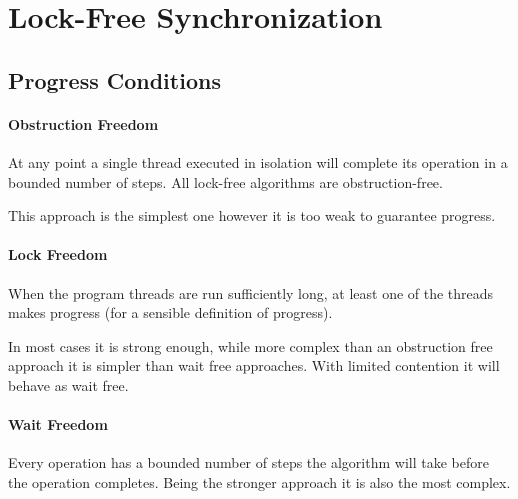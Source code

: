 \section{Lock-Free Synchronization}

\subsection{Progress Conditions}
\paragraph{Obstruction Freedom}
At any point a single thread executed in isolation will complete its operation in a bounded number of steps.
All lock-free algorithms are obstruction-free.

This approach is the simplest one however it is too weak to guarantee progress.

\paragraph{Lock Freedom}
When the program threads are run sufficiently long, at least one of the threads makes progress
(for a sensible definition of progress).

In most cases it is strong enough,
while more complex than an obstruction free approach it is simpler than wait free approaches.
With limited contention it will behave as wait free.

\paragraph{Wait Freedom}
Every operation has a bounded number of steps the algorithm will take before the operation completes.
Being the stronger approach it is also the most complex.